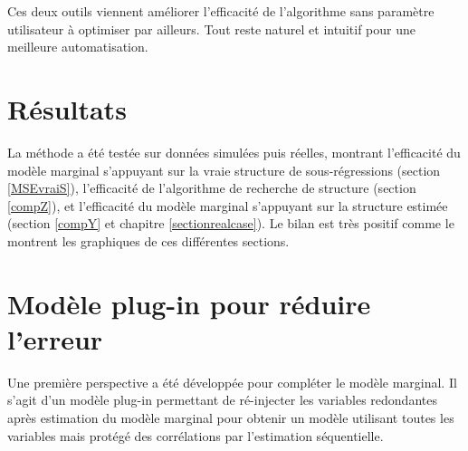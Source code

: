 \documentclass[12pt,a4paper]{report}
\begin{document}
	Ces deux outils viennent améliorer l'efficacité de l'algorithme sans paramètre utilisateur à optimiser par ailleurs. Tout reste naturel et intuitif pour une meilleure automatisation.

	\section{Résultats}
		La méthode a été testée sur données simulées puis réelles, montrant l'efficacité du modèle marginal s'appuyant sur la vraie structure de sous-régressions (section \ref{MSEvraiS}), l'efficacité de l'algorithme de recherche de structure (section \ref{compZ}), et l'efficacité du modèle marginal s'appuyant sur la structure estimée (section \ref{compY} et chapitre \ref{sectionrealcase}). Le bilan est très positif comme le montrent les graphiques de ces différentes sections.
	\section{Modèle plug-in pour réduire l'erreur}
		Une première perspective a été développée pour compléter le modèle marginal. Il s'agit d'un modèle plug-in permettant de ré-injecter les variables redondantes après estimation du modèle marginal pour obtenir un modèle utilisant toutes les variables mais protégé des corrélations par l'estimation séquentielle.
		
\end{document}
